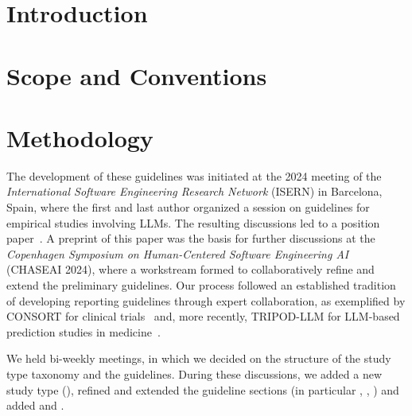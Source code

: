\section{Introduction}
\label{sec:introduction}




\section{Scope and Conventions}
\label{sec:scope}



\section{Methodology}
\label{sec:methodology}

The development of these guidelines was initiated at the 2024 meeting of the \emph{International Software Engineering Research Network} (ISERN) in Barcelona, Spain, where the first and last author organized a session on guidelines for empirical studies involving LLMs. The resulting discussions led to a position paper~\citep{DBLP:conf/wsese/0001BFB25}. A preprint of this paper was the basis for further discussions at the \emph{ Copenhagen Symposium on Human-Centered Software Engineering AI} (CHASEAI 2024), where a workstream formed to collaboratively refine and extend the preliminary guidelines.
Our process followed an established tradition of developing reporting guidelines through expert collaboration, as exemplified by CONSORT for clinical trials~\citep{Begg1996} and, more recently, TRIPOD-LLM for LLM-based prediction studies in medicine~\citep{Gallifant2025}.

We held bi-weekly meetings, in which we decided on the structure of the study type taxonomy and the guidelines.
During these discussions, we added a new study type (\synthesis), refined and extended the guideline sections (in particular \modelversion, \design, \traces) and added \benchmarksmetrics and \limitationsmitigations.


